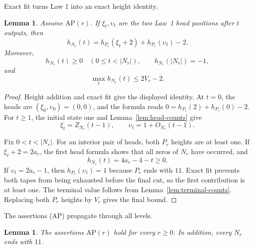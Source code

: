\documentclass[11pt]{article}
\newtheorem{lemma}[theorem]{Lemma}
\theoremstyle{definition}
\theoremstyle{remark}
\begin{document}
Exact fit turns Law 1 into an exact height identity.
\begin{lemma}
\label{lem:law1-height}
Assume \(\mathrm{AP}(r)\).  If \(\xi_t,\upsilon_t\) are the two Law~1 head positions
after \(t\) outputs, then
\[
 h_{N_r}(t)=h_{P_r}(\xi_t+2)+h_{P_r}(\upsilon_t)-2.
\]
Moreover,
\[
 h_{N_r}(t)\geq0\quad(0\leq t<|N_r|),
 \qquad h_{N_r}(|N_r|)=-1,
\]
and
\[
 \max_t h_{N_r}(t)\leq2V_r-2.
\]
\end{lemma}

\begin{proof}
Height addition and exact fit give the displayed identity.  At \(t=0\), the
heads are \((\xi_0,\upsilon_0)=(0,0)\), and the formula reads
\(0=h_{P_r}(2)+h_{P_r}(0)-2\).  For \(t\geq1\), the initial state one and
Lemma~\ref{lem:head-counts} give
\[
 \xi_t=Z_{N_r}(t-1),
 \qquad
 \upsilon_t=1+O_{N_r}(t-1).
\]

Fix \(0<t<|N_r|\).  For an interior pair of heads, both \(P_r\) heights are
at least one.  If \(\xi_t+2=2a_r\), the first head formula shows that all
zeros of \(N_r\) have occurred, and
\[
 h_{N_r}(t)=4a_r-4-t\geq0.
\]
If \(\upsilon_t=2a_r-1\), then \(h_{P_r}(\upsilon_t)=1\) because \(P_r\)
ends with \(11\).  Exact fit prevents both tapes from being exhausted before
the final cut, so the first contribution is at least one.
The terminal value follows from Lemma~\ref{lem:terminal-counts}.  Replacing
both \(P_r\) heights by \(V_r\) gives the final bound.
\end{proof}

The assertions (AP) propagate through all levels.
\begin{lemma}

The assertions \(\mathrm{AP}(r)\) hold for every \(r\geq0\).  In addition,
every \(N_r\) ends with \(11\).
\end{lemma}
\end{document}

